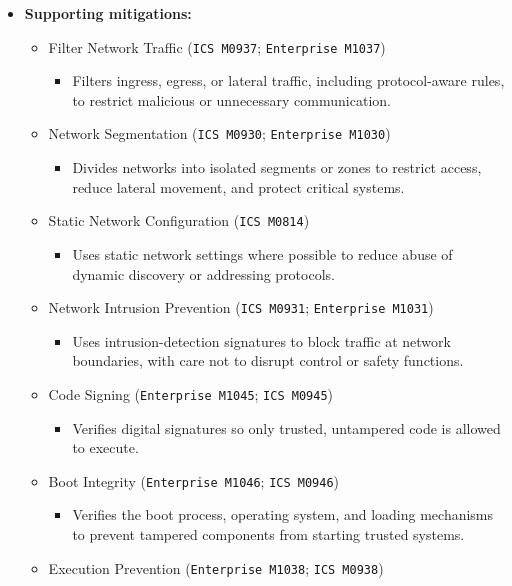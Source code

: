 \documentclass[10pt,a4paper,oneside]{report}
\begin{document}
\begin{itemize}
\item \textbf{Supporting mitigations:}
\begin{itemize}
\item Filter Network Traffic (\texttt{ICS M0937}; \texttt{Enterprise M1037})
\begin{itemize}
\item Filters ingress, egress, or lateral traffic, including protocol-aware rules, to restrict malicious or unnecessary communication.
\end{itemize}
\item Network Segmentation (\texttt{ICS M0930}; \texttt{Enterprise M1030})
\begin{itemize}
\item Divides networks into isolated segments or zones to restrict access, reduce lateral movement, and protect critical systems.
\end{itemize}
\item Static Network Configuration (\texttt{ICS M0814})
\begin{itemize}
\item Uses static network settings where possible to reduce abuse of dynamic discovery or addressing protocols.
\end{itemize}
\item Network Intrusion Prevention (\texttt{ICS M0931}; \texttt{Enterprise M1031})
\begin{itemize}
\item Uses intrusion-detection signatures to block traffic at network boundaries, with care not to disrupt control or safety functions.
\end{itemize}
\item Code Signing (\texttt{Enterprise M1045}; \texttt{ICS M0945})
\begin{itemize}
\item Verifies digital signatures so only trusted, untampered code is allowed to execute.
\end{itemize}
\item Boot Integrity (\texttt{Enterprise M1046}; \texttt{ICS M0946})
\begin{itemize}
\item Verifies the boot process, operating system, and loading mechanisms to prevent tampered components from starting trusted systems.
\end{itemize}
\item Execution Prevention (\texttt{Enterprise M1038}; \texttt{ICS M0938})

\end{itemize}
\end{itemize}
\end{document}
